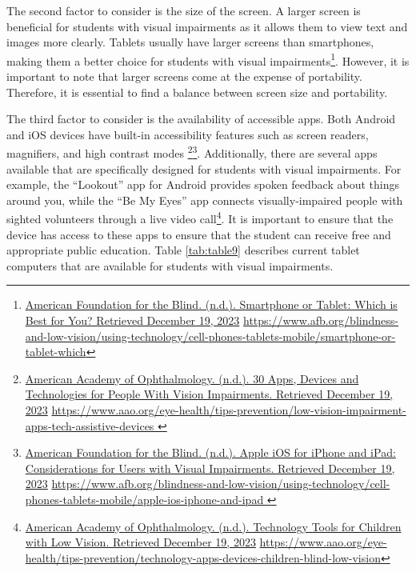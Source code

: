 The second factor to consider is the size of the screen. A larger screen is beneficial for students with visual impairments as it allows them to view text and images more clearly. Tablets usually have larger screens than smartphones, making them a better choice for students with visual impairments\footnote{\raggedright \href{https://www.afb.org/blindness-and-low-vision/using-technology/cell-phones-tablets-mobile/smartphone-or-tablet-which}{American Foundation for the Blind. (n.d.). Smartphone or Tablet: Which is Best for You? Retrieved December 19, 2023} \url{https://www.afb.org/blindness-and-low-vision/using-technology/cell-phones-tablets-mobile/smartphone-or-tablet-which}}. However, it is important to note that larger screens come at the expense of portability. Therefore, it is essential to find a balance between screen size and portability.

The third factor to consider is the availability of accessible apps. Both Android and iOS devices have built-in accessibility features such as screen readers, magnifiers, and high contrast modes \footnote{\raggedright \href{https://www.aao.org/eye-health/tips-prevention/low-vision-impairment-apps-tech-assistive-devices }{American Academy of Ophthalmology. (n.d.). 30 Apps, Devices and Technologies for People With Vision Impairments. Retrieved December 19, 2023} \url{https://www.aao.org/eye-health/tips-prevention/low-vision-impairment-apps-tech-assistive-devices }}\fnsep\footnote{\raggedright \href{https://www.afb.org/blindness-and-low-vision/using-technology/cell-phones-tablets-mobile/apple-ios-iphone-and-ipad }{American Foundation for the Blind. (n.d.). Apple iOS for iPhone and iPad: Considerations for Users with Visual Impairments. Retrieved December 19, 2023} \url{https://www.afb.org/blindness-and-low-vision/using-technology/cell-phones-tablets-mobile/apple-ios-iphone-and-ipad }}. Additionally, there are several apps available that are specifically designed for students with visual impairments. For example, the “Lookout” app for Android provides spoken feedback about things around you, while the “Be My Eyes” app connects visually-impaired people with sighted volunteers through a live video call\footnote{\raggedright \href{https://www.aao.org/eye-health/tips-prevention/technology-apps-devices-children-blind-low-vision}{American Academy of Ophthalmology. (n.d.). Technology Tools for Children with Low Vision. Retrieved December 19, 2023} \url{https://www.aao.org/eye-health/tips-prevention/technology-apps-devices-children-blind-low-vision}}. It is important to ensure that the device has access to these apps to ensure that the student can receive free and appropriate public education.
Table \ref{tab:table9} describes current tablet computers that are available for students with visual impairments.

